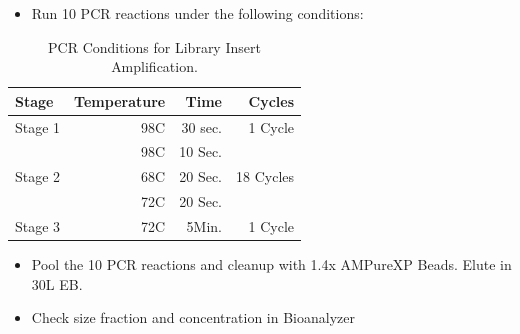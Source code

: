 \documentclass[a4paper]{article}
\begin{document}
       	\begin{itemize}      
        
        	\item Run 10 PCR reactions under the following conditions:

		\end{itemize}
            \FloatBarrier
            \begin{table}[H]
				\centering
				\begin{tabular}{l|r|r|r}
					Stage 	& 	Temperature	&	Time	&	Cycles		\\\hline
					Stage 1	&	98C			&	30 sec.	&	1 Cycle		\\\hline
							&	98C			&	10 Sec.	&				\\
                    Stage 2	&	68C			&	20 Sec.	&	18 Cycles	\\
                    		&	72C			&	20 Sec.	&				\\\hline
                    Stage 3	&	72C			&	5Min.	&	1 Cycle		\\
				\end{tabular}
           		\caption{\label{LibPCR}PCR Conditions for Library Insert Amplification.}
           \end{table}
            
       	\begin{itemize}          
    	
        \item Pool the 10 PCR reactions and cleanup with 1.4x AMPureXP Beads. Elute in 30\textmu L EB.
        
        \item Check size fraction and concentration in Bioanalyzer 
        
        \end{itemize}
        
\end{document}
